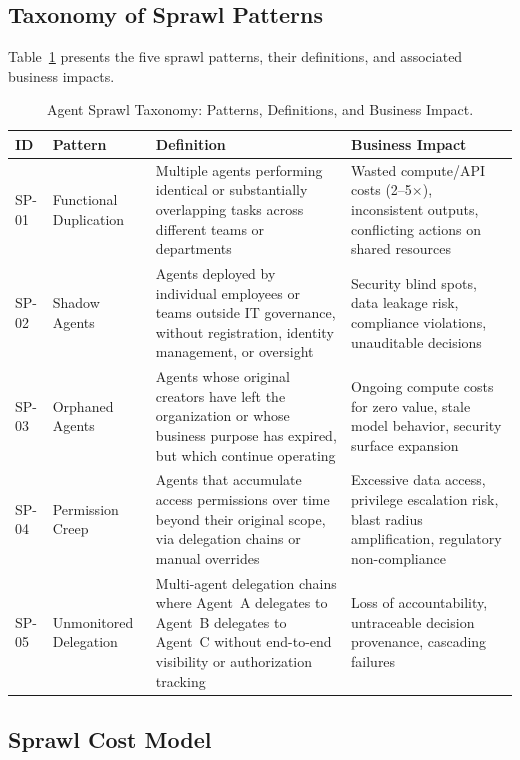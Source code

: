 \documentclass[ai,article,submit,pdftex,moreauthors]{Definitions/mdpi}
\begin{document}
\subsection{Taxonomy of Sprawl Patterns}\label{sec:taxonomy-patterns}

Table~\ref{tab:sprawl-taxonomy} presents the five sprawl patterns, their definitions, and associated business impacts.

\begin{table}[htbp]
\caption{Agent Sprawl Taxonomy: Patterns, Definitions, and Business Impact.}\label{tab:sprawl-taxonomy}
\centering
\small
\begin{tabularx}{\textwidth}{l l X X}
\toprule
\textbf{ID} & \textbf{Pattern} & \textbf{Definition} & \textbf{Business Impact} \\
\midrule
SP-01 & Functional Duplication & Multiple agents performing identical or substantially overlapping tasks across different teams or departments & Wasted compute/API costs (2--5$\times$), inconsistent outputs, conflicting actions on shared resources \\
\addlinespace
SP-02 & Shadow Agents & Agents deployed by individual employees or teams outside IT governance, without registration, identity management, or oversight & Security blind spots, data leakage risk, compliance violations, unauditable decisions \\
\addlinespace
SP-03 & Orphaned Agents & Agents whose original creators have left the organization or whose business purpose has expired, but which continue operating & Ongoing compute costs for zero value, stale model behavior, security surface expansion \\
\addlinespace
SP-04 & Permission Creep & Agents that accumulate access permissions over time beyond their original scope, via delegation chains or manual overrides & Excessive data access, privilege escalation risk, blast radius amplification, regulatory non-compliance \\
\addlinespace
SP-05 & Unmonitored Delegation & Multi-agent delegation chains where Agent~A delegates to Agent~B delegates to Agent~C without end-to-end visibility or authorization tracking & Loss of accountability, untraceable decision provenance, cascading failures \\
\bottomrule
\end{tabularx}
\end{table}

\subsection{Sprawl Cost Model}\label{sec:taxonomy-cost}
\end{document}
